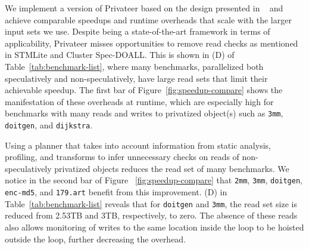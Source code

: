 We implement a version of Privateer based on the design presented in
~\cite{johnson:12:pldi} and achieve comparable speedups and runtime
overheads that scale with the larger input sets we use.
Despite being a
state-of-the-art framework in terms of applicability, Privateer misses
opportunities to remove read checks as mentioned in
STMLite\cite{mehrara:09:stmlite} and Cluster Spec-DOALL\cite{kim:12:cgo}.
This is shown in (D) of Table~\ref{tab:benchmark-list}, where many
benchmarks, parallelized both speculatively and non-speculatively, have
large read sets that limit their achievable speedup. The first bar of
Figure~\ref{fig:speedup-compare} shows the manifestation of these overheads at
runtime, which are especially high for benchmarks with many reads and
writes to privatized object(s) such as \texttt{3mm}, \texttt{doitgen}, and
\texttt{dijkstra}.
%

Using a planner that takes into account information from static
analysis, profiling, and transforms to infer unnecessary checks on reads
of non-speculatively privatized objects reduces the read set of many
benchmarks. We notice in the second bar of Figure
~\ref{fig:speedup-compare} that \texttt{2mm}, \texttt{3mm}, \texttt{doitgen},
\texttt{enc-md5}, and \texttt{179.art} benefit from this improvement. (D)
in Table~\ref{tab:benchmark-list} reveals that for \texttt{doitgen} and \texttt{3mm},
the read set size is reduced from 2.53TB and 3TB, respectively, to zero.
The absence of these reads also allows monitoring of writes to the same
location inside the loop to be hoisted outside the loop, further decreasing
the overhead.
%

